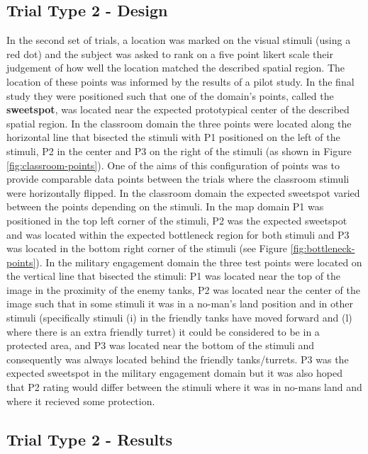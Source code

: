 \documentclass[11pt,letterpaper]{article}
\begin{document}
\subsection{Trial Type 2 - Design} 
In the second set of trials, a location was marked on the visual stimuli (using a red dot) and the subject was asked to rank on a five point likert scale their judgement of how well the location matched the described spatial region.  The location of these points was informed by the results of a pilot study. In the final study they were positioned such that one of the domain's points, called the \textbf{sweetspot}, was located near the expected prototypical center of the described spatial region. In the classroom domain the three points were located along the horizontal line that bisected the stimuli with P1 positioned on the left of the stimuli, P2 in the center and P3 on the right of the stimuli (as shown in Figure \ref{fig:classroom-points}). One of the aims of this configuration of points was to provide comparable data points between the trials where the classroom stimuli were horizontally flipped. In the classroom domain the expected sweetspot varied between the points depending on the stimuli. In the map domain P1 was positioned in the top left corner of the stimuli,  P2 was the expected sweetspot and was located within the expected bottleneck region for both stimuli and P3 was located in the bottom right corner of the stimuli (see Figure \ref{fig:bottleneck-points}).  In the military engagement domain the three test points were located on the vertical line that bisected the stimuli: P1 was located near the top of the image in the proximity of the enemy tanks, P2 was located near the center of the image such that in some stimuli it was in a no-man's land position and in other stimuli (specifically stimuli (i) in the friendly tanks have moved forward and (l) where there is an extra friendly turret) it could be considered to be in a protected area, and P3 was located near the bottom of the stimuli and consequently was always located behind the friendly tanks/turrets. P3 was the expected sweetspot in the military engagement domain but it was also hoped that P2 rating would differ between the stimuli where it was in no-mans land and where it recieved some protection. 

\subsection{Trial Type 2 - Results}
\end{document}
